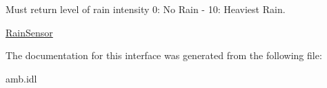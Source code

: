 Must return level of rain intensity 0\-: No Rain -\/ 10\-: Heaviest Rain. 

\hyperlink{interfaceVehicle_1_1org_1_1automotive_1_1RainSensor}{Rain\-Sensor} 

The documentation for this interface was generated from the following file\-:\begin{DoxyCompactItemize}
\item 
amb.\-idl\end{DoxyCompactItemize}
